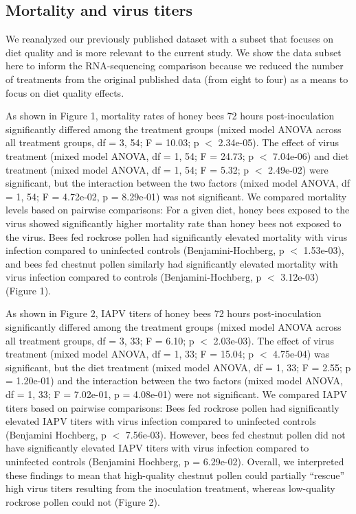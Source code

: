 \documentclass{bmcart}
\begin{document}
\begin{linenumbers}
\begin{doublespacing}
\subsection*{Mortality and virus titers}

We reanalyzed our previously published dataset with a subset that focuses on diet quality and is more relevant to the current study. We show the data subset here to inform the RNA-sequencing comparison because we reduced the number of treatments from the original published data (from eight to four) \cite{adamInt} as a means to focus on diet quality effects.

As shown in Figure 1, mortality rates of honey bees 72 hours post-inoculation significantly differed among the treatment groups (mixed model ANOVA across all treatment groups, df = 3, 54; F = 10.03; p $<$ 2.34e-05). The effect of virus treatment (mixed model ANOVA, df = 1, 54; F = 24.73; p $<$ 7.04e-06) and diet treatment (mixed model ANOVA, df = 1, 54; F = 5.32; p $<$ 2.49e-02) were significant, but the interaction between the two factors (mixed model ANOVA, df = 1, 54; F = 4.72e-02, p = 8.29e-01) was not significant. We compared mortality levels based on pairwise comparisons: For a given diet, honey bees exposed to the virus showed significantly higher mortality rate than honey bees not exposed to the virus. Bees fed rockrose pollen had significantly elevated mortality with virus infection compared to uninfected controls (Benjamini-Hochberg, p $<$ 1.53e-03), and bees fed chestnut pollen similarly had significantly elevated mortality with virus infection compared to controls (Benjamini-Hochberg, p $<$ 3.12e-03) (Figure 1).

As shown in Figure 2, IAPV titers of honey bees 72 hours post-inoculation significantly differed among the treatment groups (mixed model ANOVA across all treatment groups, df = 3, 33; F = 6.10; p $<$ 2.03e-03). The effect of virus treatment (mixed model ANOVA, df = 1, 33; F = 15.04; p $<$ 4.75e-04) was significant, but the diet treatment (mixed model ANOVA, df = 1, 33; F = 2.55; p = 1.20e-01) and the interaction between the two factors (mixed model ANOVA, df = 1, 33; F = 7.02e-01, p = 4.08e-01) were not significant. We compared IAPV titers  based on pairwise comparisons: Bees fed rockrose pollen had significantly elevated IAPV titers with virus infection compared to uninfected controls (Benjamini Hochberg, p $<$ 7.56e-03). However, bees fed chestnut pollen did not have significantly elevated IAPV titers with virus infection compared to uninfected controls (Benjamini Hochberg, p = 6.29e-02). Overall, we interpreted these findings to mean that high-quality chestnut pollen could partially ``rescue'' high virus titers resulting from the inoculation treatment, whereas low-quality rockrose pollen could not (Figure 2).


\end{doublespacing}
\end{linenumbers}
\end{document}
